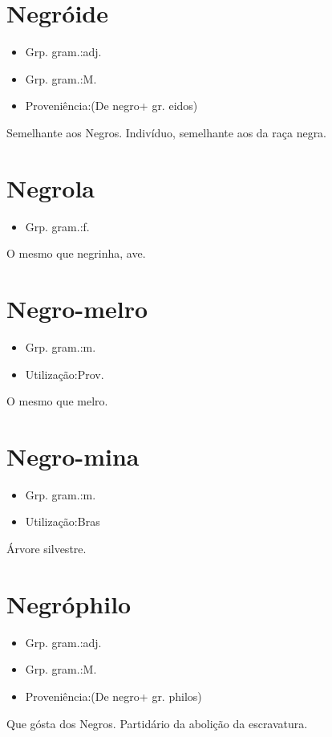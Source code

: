 \section{Negróide}
\begin{itemize}
\item {Grp. gram.:adj.}
\end{itemize}
\begin{itemize}
\item {Grp. gram.:M.}
\end{itemize}
\begin{itemize}
\item {Proveniência:(De \textunderscore negro\textunderscore  + gr. \textunderscore eidos\textunderscore )}
\end{itemize}
Semelhante aos Negros.
Indivíduo, semelhante aos da raça negra.
\section{Negrola}
\begin{itemize}
\item {Grp. gram.:f.}
\end{itemize}
O mesmo que \textunderscore negrinha\textunderscore , ave.
\section{Negro-melro}
\begin{itemize}
\item {Grp. gram.:m.}
\end{itemize}
\begin{itemize}
\item {Utilização:Prov.}
\end{itemize}
O mesmo que \textunderscore melro\textunderscore .
\section{Negro-mina}
\begin{itemize}
\item {Grp. gram.:m.}
\end{itemize}
\begin{itemize}
\item {Utilização:Bras}
\end{itemize}
Árvore silvestre.
\section{Negróphilo}
\begin{itemize}
\item {Grp. gram.:adj.}
\end{itemize}
\begin{itemize}
\item {Grp. gram.:M.}
\end{itemize}
\begin{itemize}
\item {Proveniência:(De \textunderscore negro\textunderscore  + gr. \textunderscore philos\textunderscore )}
\end{itemize}
Que gósta dos Negros.
Partidário da abolição da escravatura.
